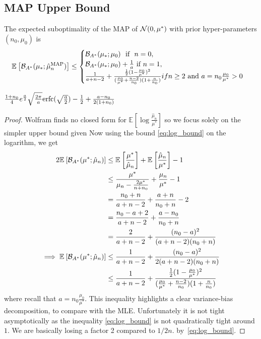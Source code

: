 \documentclass{article}
\newcommand*{\expect}[2][]{\ensuremath{\mathbb{E}_{#1} \left[ #2 \right] }} %
\newcommand{\logpart}{A}
\newcommand{\bregmanconj}{\cB_{\logpart^*}}
\newcommand{\MAPm}{\hat \mu_n}
\begin{document}
\subsection{MAP Upper Bound}
\begin{theorem}
 The expected suboptimality of the MAP of $\cN(0,\mu^*)$ with prior hyper-parameters $(n_0,\mu_0)$ is 
\begin{equation}
	\expect{\bregmanconj( \mu_*; \hat \mu_n^\text{MAP})}
	\leq \begin{cases}
		\bregmanconj( \mu_*; \mu_0) \ \text{ if } \ n=0, \\
		\bregmanconj( \mu_*; \mu_0) +\inv{a} \ \text{if}\ n=1,\\
		\frac{1}{a+n-2} + \frac{\half(1 - \frac{\mu_0}{\mu^*})^2}{(\frac{\mu_0}{\mu^*}+\frac{n-2}{n_0})(1 + \frac{n}{n_0} )} if n\geq 2 \ \text{and}\ a=n_0 \frac{\mu_0}{\mu^*} >0
	\end{cases}
\end{equation}
\end{theorem}

$\frac{1+n_0}{4} e^{\half[a]} \sqrt{\frac{2 \pi}{a}} \mathrm{erfc}(\sqrt{\half[a]})  - \half  + \frac{a - n_0}{2(1+n_0)} $

\begin{proof}
		Wolfram finds no closed form for $\expect{\log\frac{\MAPm}{\mu^*}}$ so we focus solely on the simpler upper bound given Now using the bound \eqref{eq:log_bound} on the logarithm, we get
\begin{align}
	2\expect{\bregmanconj(\mu^*; \MAPm)} 
	&\leq \expect{\frac{\mu^*}{\MAPm}}  + \expect{\frac{\MAPm}{\mu^*}} - 1 \\
	&\leq \frac{\mu^*}{\mu_n - \frac{2 \mu^*}{n + n_0}}   + \frac{\mu_n}{\mu^*} - 1 \\
	&= \frac{n_0 + n}{a +n - 2} + \frac{a+n}{n_0 + n} - 2 \\
	&= \frac{n_0 - a + 2}{a +n - 2} + \frac{a - n_0}{n_0 + n} \\
	&= \frac{2}{a+n-2} + \frac{(n_0 - a)^2}{(a+n-2)(n_0 + n)} \\
	\implies \expect{\bregmanconj(\mu^*; \MAPm)} 
	&\leq \frac{1}{a+n-2} + \frac{(n_0 - a)^2}{2(a+n-2)(n_0 + n)} \\
	&\leq \frac{1}{a+n-2} + \frac{\half(1 - \frac{\mu_0}{\mu^*})^2}{(\frac{\mu_0}{\mu^*}+\frac{n-2}{n_0})(1 + \frac{n}{n_0} )} 
\end{align}
where recall that $a=n_0\frac{\mu_0}{\mu^*}$. 
This inequality highlights a clear variance-bias decomposition, to compare with the MLE. Unfortunately it is not tight asymptotically as the inequality \eqref{eq:log_bound} is not quadratically tight around $1$. We are basically losing a factor 2 compared to $1/2n$. by~\eqref{eq:log_bound}.
\end{proof}
\end{document}
